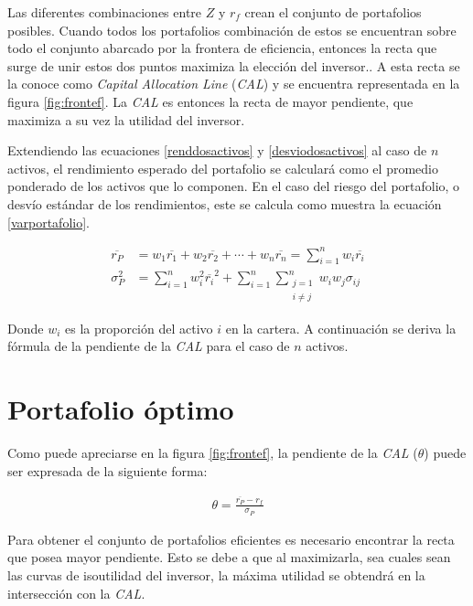 Las diferentes combinaciones entre $Z$ y $r_f$ crean el conjunto de portafolios posibles. Cuando todos los portafolios combinación de estos se encuentran  sobre todo el conjunto abarcado por la frontera de eficiencia, entonces la recta que surge de unir estos dos puntos maximiza la elección del inversor.. A esta recta se la conoce como \textit{Capital Allocation Line} (\textit{CAL}) y se encuentra representada en la figura \ref{fig:frontef}. La \textit{CAL} es entonces la recta de mayor pendiente, que maximiza a su vez la utilidad del inversor.

Extendiendo las ecuaciones \eqref{renddosactivos} y \eqref{desviodosactivos} al caso de $n$ activos, el rendimiento esperado del portafolio se calculará como el promedio ponderado de los activos que lo componen. En el caso del riesgo del portafolio, o desvío estándar de los rendimientos, este se calcula como muestra la ecuación \eqref{varportafolio}.

\begin{align}
	\overline{r_P} &= w_1 \overline{r_1} + w_2 \overline{r_2} + \dotsb + 
		w_n \overline{r_n} = \sum\limits_{i=1}^n w_i \overline{r_i} \label{rendportafolio} \\
	\sigma_P^2 &= \sum\limits_{i=1}^n w_i^2 \overline{r_i}^2 + 
		\sum\limits_{i=1}^n \sum\limits_{\substack{j=1 \\ i \neq j}}^n w_i w_j \sigma_{ij}  \label{varportafolio}
\end{align}

Donde $w_i$ es la proporción del activo $i$ en la cartera. A continuación se deriva la fórmula de la pendiente de la \textit{CAL} para el caso de $n$ activos.


\section{Portafolio óptimo}

Como puede apreciarse en la figura \ref{fig:frontef}, la pendiente de la \textit{CAL} ($\theta$) puede ser expresada de la siguiente forma:

\begin{align}
	\theta = \frac{\overline{r_P} - r_f}{\sigma_P}
\end{align} 

Para obtener el conjunto de portafolios eficientes es necesario encontrar la recta que posea mayor pendiente. Esto se debe a que al maximizarla, sea cuales sean las curvas de isoutilidad del inversor, la máxima utilidad se obtendrá en la intersección con la \textit{CAL}.

